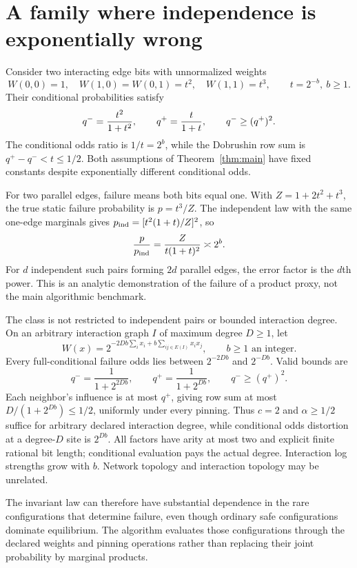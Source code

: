 \documentclass[11pt]{article}
\begin{document}
\section{A family where independence is exponentially wrong}
\label{sec:example}
Consider two interacting edge bits with unnormalized weights
\[
 W(0,0)=1,\quad W(1,0)=W(0,1)=t^2,\quad W(1,1)=t^3,
 \qquad t=2^{-b},\ b\ge1.
\]
Their conditional probabilities satisfy
\[
 q^-={t^2\over1+t^2},\qquad q^+={t\over1+t},\qquad
 q^-\ge(q^+)^2.
\]
The conditional odds ratio is $1/t=2^b$, while the Dobrushin row sum is $q^+-q^-<t\le1/2$. Both assumptions of Theorem~\ref{thm:main} have fixed constants despite exponentially different conditional odds.

For two parallel edges, failure means both bits equal one. With $Z=1+2t^2+t^3$, the true static failure probability is $p=t^3/Z$. The independent law with the same one-edge marginals gives $p_{\rm ind}=[t^2(1+t)/Z]^2$, so
\[
 {p\over p_{\rm ind}}={Z\over t(1+t)^2}\asymp2^b.
\]
For $d$ independent such pairs forming $2d$ parallel edges, the error factor is the $d$th power. This is an analytic demonstration of the failure of a product proxy, not the main algorithmic benchmark.

The class is not restricted to independent pairs or bounded interaction degree. On an arbitrary interaction graph $I$ of maximum degree $D\ge1$, let
\[
 W(x)=2^{-2Db\sum_i x_i+b\sum_{ij\in E(I)}x_ix_j},\qquad b\ge1\text{ an integer}.
\]
Every full-conditional failure odds lies between $2^{-2Db}$ and $2^{-Db}$. Valid bounds are
\[
 q^-=\frac1{1+2^{2Db}},\qquad q^+=\frac1{1+2^{Db}},
 \qquad q^-\ge(q^+)^2.
\]
Each neighbor's influence is at most $q^+$, giving row sum at most $D/(1+2^{Db})\le1/2$, uniformly under every pinning. Thus $c=2$ and $\alpha\ge1/2$ suffice for arbitrary declared interaction degree, while conditional odds distortion at a degree-$D$ site is $2^{Db}$. All factors have arity at most two and explicit finite rational bit length; conditional evaluation pays the actual degree. Interaction log strengths grow with $b$. Network topology and interaction topology may be unrelated.

The invariant law can therefore have substantial dependence in the rare configurations that determine failure, even though ordinary safe configurations dominate equilibrium. The algorithm evaluates those configurations through the declared weights and pinning operations rather than replacing their joint probability by marginal products.
\end{document}
